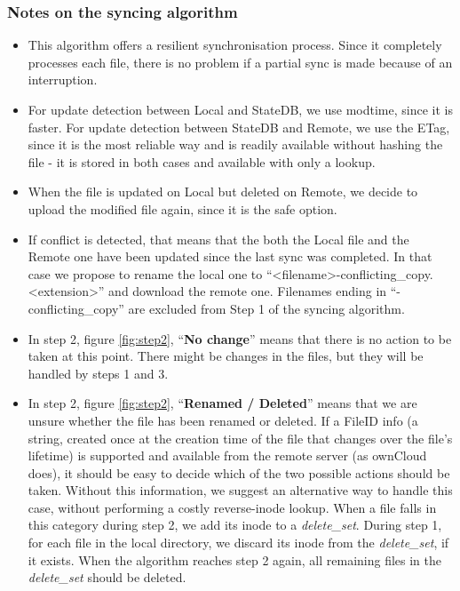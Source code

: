     \subsubsection{Notes on the syncing algorithm}
      \begin{itemize}
        \item This algorithm offers a resilient synchronisation process. Since it completely processes each file, there is no problem if a partial sync is made because of an interruption.
        \item For update detection between Local and StateDB, we use modtime, since it is faster. For update detection between StateDB and Remote, we use the ETag, since it is the most reliable way and is readily available without hashing the file - it is stored in both cases and available with only a lookup.
        \item When the file is updated on Local but deleted on Remote, we decide to upload the modified file again, since it is the safe option.
        \item If conflict is detected, that means that the both the Local file and the Remote one have been updated since the last sync was completed. In that case we propose to rename the local one to ``<filename>-conflicting\_copy.<extension>'' and download the remote one. Filenames ending in ``-conflicting\_copy'' are excluded from Step 1 of the syncing algorithm.
        \item In step 2, figure \ref{fig:step2}, ``\textbf{No change}'' means that there is no action to be taken at this point. There might be changes in the files, but they will be handled by steps 1 and 3.
        \item In step 2, figure \ref{fig:step2}, ``\textbf{Renamed / Deleted}'' means that we are unsure whether the file has been renamed or deleted. If a FileID info (a string, created once at the creation time of the file that changes over the file's lifetime) is supported and available from the remote server (as ownCloud does), it should be easy to decide which of the two possible actions should be taken.
        Without this information, we suggest an alternative way to handle this case, without performing a costly reverse-inode lookup. When a file falls in this category during step 2, we add its inode to a \emph{delete\_set}. During step 1, for each file in the local directory, we discard its inode from the \emph{delete\_set}, if it exists. When the algorithm reaches step 2 again, all remaining files in the \emph{delete\_set} should be deleted.
      \end{itemize}


